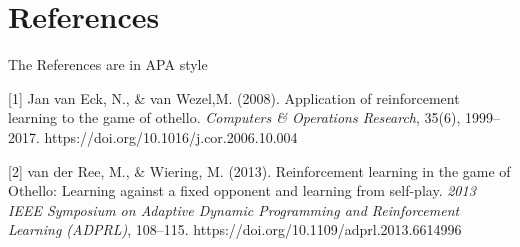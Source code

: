 \documentclass[../proposal.tex]{subfiles}
\begin{document}
\section*{References}

The References are in APA style
\medskip



\small


[1] Jan van Eck, N., \& van Wezel,M. (2008).
 Application of reinforcement learning to the game of othello. 
{\it Computers \& Operations Research}, 35(6), 1999–2017. https://doi.org/10.1016/j.cor.2006.10.004 

[2] van der Ree, M., \& Wiering, M. (2013).
Reinforcement learning in the game of Othello: Learning against a fixed opponent and learning from self-play. 
{\it 2013 IEEE Symposium on Adaptive Dynamic Programming and Reinforcement Learning (ADPRL)}, 108–115. https://doi.org/10.1109/adprl.2013.6614996 
\end{document}
